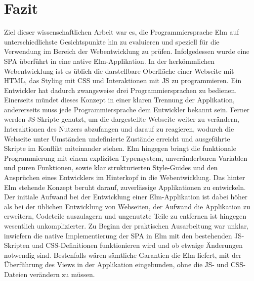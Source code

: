 \chapter{Fazit}
\label{chap:fazit}
Ziel dieser wissenschaftlichen Arbeit war es, die Programmiersprache Elm auf unterschiedlichste Gesichtspunkte hin zu evaluieren und speziell für die Verwendung im Bereich der Webentwicklung zu prüfen. Infolgedessen wurde eine \ac{SPA} überführt in eine native Elm-Applikation. In der herkömmlichen Webentwicklung ist es üblich die darstellbare Oberfläche einer Webseite mit \ac{HTML}, das Styling mit \ac{CSS} und Interaktionen mit \ac{JS} zu programmieren. Ein Entwickler hat dadurch zwangsweise drei Programmiersprachen zu bedienen. Einerseits mündet dieses Konzept in einer klaren Trennung der Applikation, andererseits muss jede Programmiersprache dem Entwickler bekannt sein. Ferner werden \ac{JS}-Skripte genutzt, um die dargestellte Webseite weiter zu verändern, Interaktionen des Nutzers abzufangen und darauf zu reagieren, wodurch die Webseite unter Umständen undefinierte Zustände erreicht und ausgeführte Skripte im Konflikt miteinander stehen.
Elm hingegen bringt die funktionale Programmierung mit einem expliziten Typensystem, unveränderbaren Variablen und puren Funktionen, sowie klar strukturierten Style-Guides und den Ansprüchen eines Entwicklers im Hinterkopf in die Webentwicklung. Das hinter Elm stehende Konzept beruht darauf, zuverlässige Applikationen zu entwickeln. Der initiale Aufwand bei der Entwicklung einer Elm-Applikation ist dabei höher als bei der üblichen Entwicklung von Webseiten, der Aufwand die Applikation zu erweitern, Codeteile auszulagern und ungenutzte Teile zu entfernen ist hingegen wesentlich unkomplizierter.
Zu Beginn der praktischen Ausarbeitung war unklar, inwiefern die native Implementierung der \ac{SPA} in Elm mit den bestehenden \ac{JS}-Skripten und \ac{CSS}-Definitionen funktionieren wird und ob etwaige Änderungen notwendig sind. Bestenfalls wären sämtliche Garantien die Elm liefert, mit der Überführung des Views in der Applikation eingebunden, ohne die \ac{JS}- und \ac{CSS}-Dateien verändern zu müssen.
